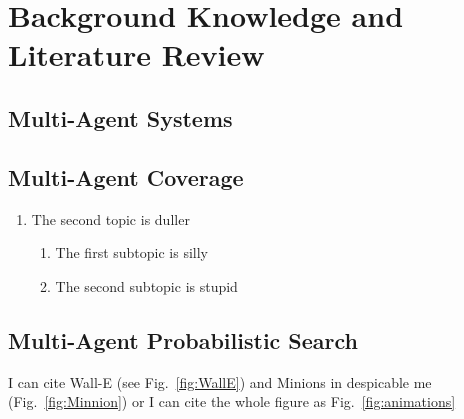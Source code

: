 
\chapter{Background Knowledge and Literature Review}
\placeholder{}
\ifpdf
    \graphicspath{{Chapter2/Figs/Raster/}{Chapter2/Figs/PDF/}{Chapter2/Figs/}}
\else
    \graphicspath{{Chapter2/Figs/Vector/}{Chapter2/Figs/}}
\fi


\section[Short title]{Multi-Agent Systems}


\section{Multi-Agent Coverage}

\begin{enumerate}

\item The second topic is duller
\begin{enumerate}
\item The first subtopic is silly
\item The second subtopic is stupid
\end{enumerate}
\end{enumerate}

\section{Multi-Agent Probabilistic Search}

\begin{landscape}

I can cite Wall-E (see Fig.~\ref{fig:WallE}) and Minions in despicable me (Fig.~\ref{fig:Minnion}) or I can cite the whole figure as Fig.~\ref{fig:animations}



\end{landscape}
